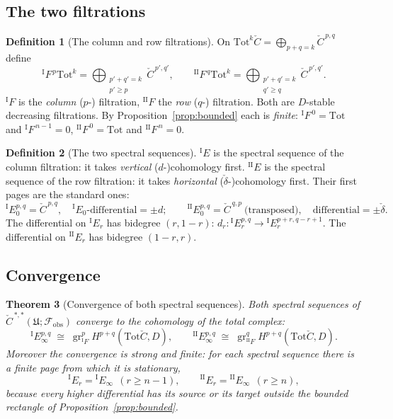 \documentclass[11pt,oneside]{amsart}
\theoremstyle{plain}
\newtheorem{theorem}{Theorem}[section]
\theoremstyle{definition}
\newtheorem{definition}[theorem]{Definition}
\theoremstyle{remark}
\theoremstyle{honeststyle}
\newcommand{\Tot}{\mathrm{Tot}}
\newcommand{\fobs}{\mathcal{F}_{\mathrm{obs}}}
\newcommand{\Uf}{\mathfrak{U}}
\newcommand{\Ccheck}{\check{C}}
\DeclareMathOperator{\gr}{gr}
\begin{document}
\subsection{The two filtrations}
\label{ssec:filtrations}

\begin{definition}[The column and row filtrations]
\label{def:filtrations}
On $\Tot^{k}\Ccheck=\bigoplus_{p+q=k}\Ccheck^{\,p,q}$ define
\[
  {}^{\mathrm{I}}F^{\,p}\Tot^{k}
   =\bigoplus_{\substack{p'+q'=k\\p'\ge p}}\Ccheck^{\,p',q'},
  \qquad
  {}^{\mathrm{II}}F^{\,q}\Tot^{k}
   =\bigoplus_{\substack{p'+q'=k\\q'\ge q}}\Ccheck^{\,p',q'}.
\]
${}^{\mathrm{I}}F$ is the \emph{column} ($p$-) filtration,
${}^{\mathrm{II}}F$ the \emph{row} ($q$-) filtration. Both are
$D$-stable decreasing filtrations. By Proposition~\ref{prop:bounded}
each is \emph{finite}: ${}^{\mathrm{I}}F^{\,0}=\Tot$ and
${}^{\mathrm{I}}F^{\,n-1}=0$, ${}^{\mathrm{II}}F^{\,0}=\Tot$ and
${}^{\mathrm{II}}F^{\,n}=0$.
\end{definition}

\begin{definition}[The two spectral sequences]
\label{def:twoss}
${}^{\mathrm{I}}E$ is the spectral sequence of the column filtration:
it takes \emph{vertical} ($d$-)cohomology first. ${}^{\mathrm{II}}E$
is the spectral sequence of the row filtration: it takes
\emph{horizontal} ($\check\delta$-)cohomology first. Their first pages
are the standard ones:
\[
  {}^{\mathrm{I}}E_{0}^{p,q}=\Ccheck^{\,p,q},\quad
  {}^{\mathrm{I}}E_{0}\text{-differential}=\pm d;
  \qquad
  {}^{\mathrm{II}}E_{0}^{p,q}=\Ccheck^{\,q,p}\ \text{(transposed)},\quad
  \text{differential}=\pm\check\delta.
\]
The differential on ${}^{\mathrm{I}}E_{r}$ has bidegree $(r,1-r)$:
$d_{r}\colon{}^{\mathrm{I}}E_{r}^{p,q}\to
{}^{\mathrm{I}}E_{r}^{p+r,q-r+1}$. The differential on
${}^{\mathrm{II}}E_{r}$ has bidegree $(1-r,r)$.
\end{definition}

\subsection{Convergence}
\label{ssec:convergence}

\begin{theorem}[Convergence of both spectral sequences]
\label{thm:convergence}
Both spectral sequences of $\Ccheck^{\,*,*}(\Uf;\fobs)$ converge to
the cohomology of the total complex:
\[
  {}^{\mathrm{I}}E_{\infty}^{p,q}\;\cong\;
  \gr^{p}_{{}^{\mathrm{I}}F}H^{p+q}(\Tot\Ccheck,D),
  \qquad
  {}^{\mathrm{II}}E_{\infty}^{p,q}\;\cong\;
  \gr^{q}_{{}^{\mathrm{II}}F}H^{p+q}(\Tot\Ccheck,D).
\]
Moreover the convergence is \emph{strong} and \emph{finite}: for each
spectral sequence there is a finite page from which it is stationary,
\[
  {}^{\mathrm{I}}E_{r}={}^{\mathrm{I}}E_{\infty}\ \ (r\ge n-1),
  \qquad
  {}^{\mathrm{II}}E_{r}={}^{\mathrm{II}}E_{\infty}\ \ (r\ge n),
\]
because every higher differential has its source or its target
outside the bounded rectangle of Proposition~\ref{prop:bounded}.
\end{theorem}
\end{document}
